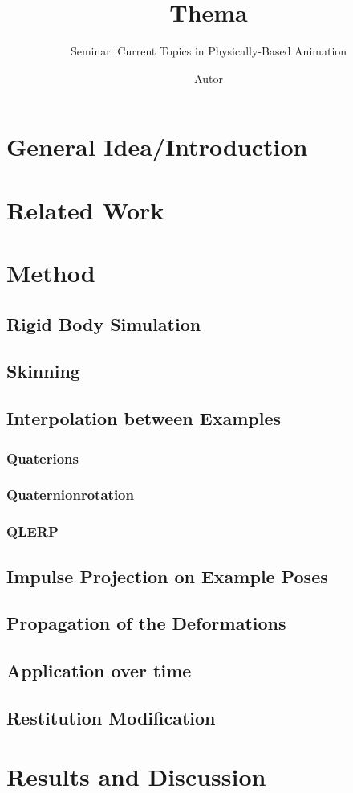 \documentclass[
11pt, 
DIV10,
a4paper, 
oneside, 
headings=normal, 
captions=tableheading,
final, 
numbers=noenddot
]{scrartcl}
\title{Thema}
\subtitle{\vspace{0.5cm}Seminar: Current Topics in Physically-Based Animation}
\author{Autor}
\begin{document}
\tableofcontents
\section{General Idea/Introduction}
\section{Related Work}
\section{Method}
	\subsection{Rigid Body Simulation}
	\subsection{Skinning}
	\subsection{Interpolation between Examples}
		\subsubsection{Quaterions}
		\subsubsection{Quaternionrotation}
		\subsubsection{QLERP}
	\subsection{Impulse Projection on Example Poses}
	\subsection{Propagation of the Deformations}
	\subsection{Application over time}
	\subsection{Restitution Modification}
\section{Results and Discussion}
\end{document}
